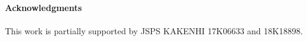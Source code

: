 \documentclass[a4paper,11pt]{scrartcl}
\theoremstyle{plain}
\theoremstyle{definition}
\theoremstyle{remark}
\begin{document}
\paragraph{Acknowledgments}

This work is partially supported by 
JSPS KAKENHI 17K06633 and 18K18898.
\end{document}
